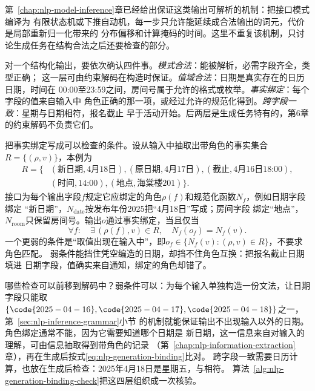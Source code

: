 第~\ref{chap:nlp-model-inference}章已经给出保证这类输出可解析的机制：把接口模式编译为
有限状态机或下推自动机，每一步只允许能延续成合法输出的词元，代价是局部重新归一化带来的
分布偏移和计算掩码的时间。这里不重复该机制，只讨论生成任务在结构合法之后还要检查的部分。

对一个结构化输出，要依次确认四件事。\emph{模式合法}：能被解析，必需字段齐全，类型正确；
这一层可由约束解码在构造时保证。\emph{值域合法}：日期是真实存在的日历日期，时间在
00:00至23:59之间，房间号属于允许的格式或枚举。\emph{事实绑定}：每个字段的值来自输入中
角色正确的那一项，或经过允许的规范化得到。\emph{跨字段一致}：星期与日期相符，报名截止
早于活动开始。后两层是生成任务特有的，第6章的约束解码不负责它们。

把事实绑定写成可以检查的条件。设从输入中抽取出带角色的事实集合
$R=\{(\rho,v)\}$，本例为
\[
  \begin{aligned}
  R=\{&(\text{新日期},\text{4月18日}),(\text{原日期},\text{4月17日}),
  (\text{截止},\text{4月16日18:00}),\\
  &(\text{时间},\text{14:00}),(\text{地点},\text{海棠楼201})\}.
  \end{aligned}
\]
接口为每个输出字段$f$规定它应绑定的角色$\rho(f)$和规范化函数$N_f$，例如日期字段绑定
“新日期”，$N_{\mathrm{date}}$按发布年份2025把“4月18日”写成；房间字段
绑定“地点”，$N_{\mathrm{room}}$只保留房间号。输出$o$通过事实绑定，当且仅当
\begin{equation}
  \forall f:\quad \exists\,(\rho(f),v)\in R,\quad N_f(o_f)=N_f(v).
  \label{eq:nlp-generation-binding}
\end{equation}
一个更弱的条件是“取值出现在输入中”，即$o_f\in\{N_f(v):(\rho,v)\in R\}$，不要求角色匹配。
弱条件能挡住凭空编造的日期，却挡不住角色互换：把报名截止日期填进
日期字段，值确实来自通知，绑定的角色却错了。

哪些检查可以前移到解码中？弱条件可以：为每个输入单独构造一份文法，让日期字段只能取
$\{\code{2025-04-16},\code{2025-04-17},\code{2025-04-18}\}$之一，第~\ref{sec:nlp-inference-grammar}小节
的机制就能保证输出不出现输入以外的日期。角色绑定通常不能，因为它需要知道哪个日期是
新日期，这一信息来自对输入的理解，可由信息抽取得到带角色的记录
（第~\ref{chap:nlp-information-extraction}章），再在生成后按式\eqref{eq:nlp-generation-binding}比对。
跨字段一致需要日历计算，也放在生成后检查：2025年4月18日是星期五，与相符。
算法~\ref{alg:nlp-generation-binding-check}把这四层组织成一次核验。

